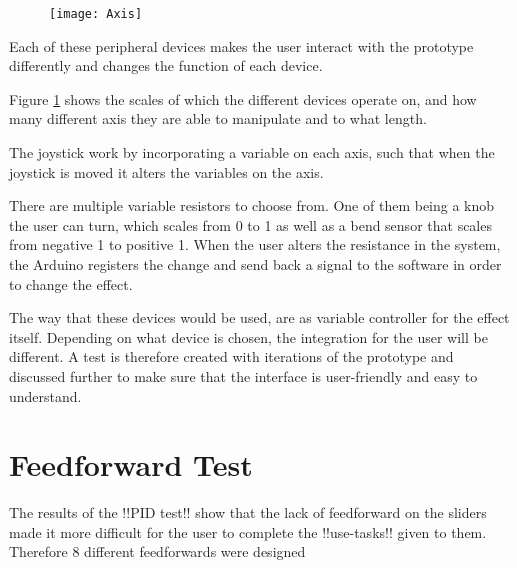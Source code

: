 \begin{figure}[!h] 
\centering
\texttt{[image: Axis]}
\caption{\label{fig:axis}}
\end{figure}



Each of these peripheral devices makes the user interact with the prototype differently and changes the function of each device.

Figure \ref{fig:axis} shows the scales of which the different devices operate on, and how many different axis they are able to manipulate and to what length.
 
The joystick work by incorporating a variable on each axis, such that when the joystick is moved it alters the variables on the axis. 

There are multiple variable resistors to choose from. One of them being a knob the user can turn, which scales from 0 to 1 as well as a bend sensor that scales from negative 1 to positive 1. When the user alters the resistance in the system, the Arduino registers the change and send back a signal to the software in order to change the effect.

The way that these devices would be used, are as variable controller for the effect itself. Depending on what device is chosen, the integration for the user will be different.  A test is therefore created with iterations of the prototype and discussed further to make sure that the interface is user-friendly and easy to understand. 

\section{Feedforward Test}\label{fftest}
The results of the !!PID test!! show that the lack of feedforward on the sliders made it more difficult for the user to complete the !!use-tasks!! given to them. Therefore 8 different feedforwards were designed 


















 
